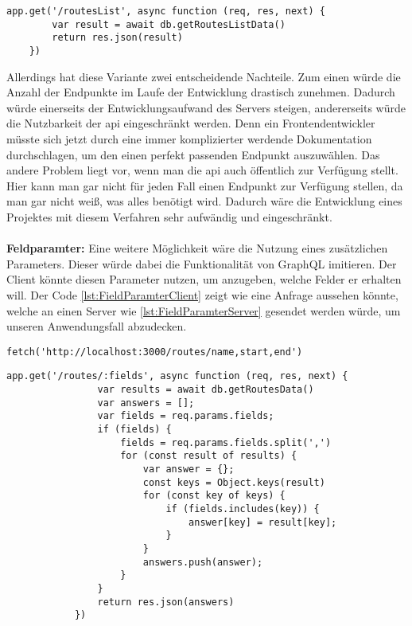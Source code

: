 \begin{lstlisting}[caption={REST Server Implementierung},captionpos=b,label=lst:RESTOverfetching1] 
	app.get('/routesList', async function (req, res, next) {
		var result = await db.getRoutesListData()
		return res.json(result)
	})
\end{lstlisting}

Allerdings hat diese Variante zwei entscheidende Nachteile. Zum einen würde die Anzahl der Endpunkte im Laufe der Entwicklung drastisch zunehmen. Dadurch würde einerseits der Entwicklungsaufwand des Servers steigen, andererseits würde die Nutzbarkeit der \ac{api} eingeschränkt werden. Denn ein Frontendentwickler müsste sich jetzt durch eine immer komplizierter werdende Dokumentation durchschlagen, um den einen perfekt passenden Endpunkt auszuwählen. Das andere Problem liegt vor, wenn man die \ac{api} auch öffentlich zur Verfügung stellt. Hier kann man gar nicht für jeden Fall einen Endpunkt zur Verfügung stellen, da man gar nicht weiß, was alles benötigt wird. Dadurch wäre die Entwicklung eines Projektes mit diesem Verfahren sehr aufwändig und eingeschränkt.\\
\\
\textbf{Feldparamter:} Eine weitere Möglichkeit wäre die Nutzung eines zusätzlichen Parameters. Dieser würde dabei die Funktionalität von GraphQL imitieren. Der Client könnte diesen Parameter nutzen, um anzugeben, welche Felder er erhalten will. Der Code \ref{lst:FieldParamterClient} zeigt wie eine Anfrage aussehen könnte, welche an einen Server wie \ref{lst:FieldParamterServer} gesendet werden würde, um unseren Anwendungsfall abzudecken.\\
\begin{lstlisting}[caption={Client Anfrage mit Feldparametern},captionpos=b,label=lst:FieldParamterClient] 
	fetch('http://localhost:3000/routes/name,start,end')
\end{lstlisting}
\begin{lstlisting}[caption={Server Implementierung für Feldparameter},captionpos=b,label=lst:FieldParamterServer] 
	app.get('/routes/:fields', async function (req, res, next) {
                var results = await db.getRoutesData()
                var answers = [];
                var fields = req.params.fields;
                if (fields) {
                    fields = req.params.fields.split(',')
                    for (const result of results) {
                        var answer = {};
                        const keys = Object.keys(result)
                        for (const key of keys) {
                            if (fields.includes(key)) {
                                answer[key] = result[key];
                            }
                        }
                        answers.push(answer);
                    }
                }
                return res.json(answers)
            })
\end{lstlisting}

